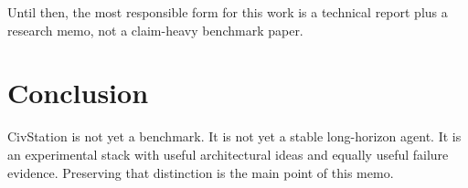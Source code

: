\documentclass[11pt]{article}
\begin{document}
Until then, the most responsible form for this work is a technical report plus a research memo, not a claim-heavy benchmark paper.

\section{Conclusion}

CivStation is not yet a benchmark. It is not yet a stable long-horizon agent. It is an experimental stack with useful architectural ideas and equally useful failure evidence. Preserving that distinction is the main point of this memo.
\end{document}
